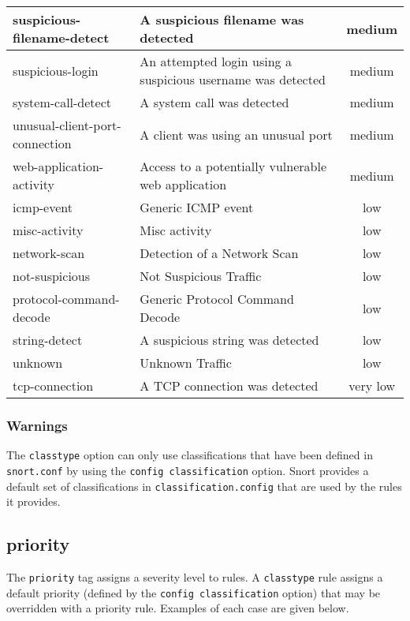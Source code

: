 \documentclass[english]{report}
\begin{document}
\begin{center}
\begin{longtable}[h]{|p{2in}|p{2.5in}|c|}
\hline 
suspicious-filename-detect&
A suspicious filename was detected & medium\\
\hline 
suspicious-login&
An attempted login using a suspicious username was detected & medium\\
\hline 
system-call-detect&
A system call was detected & medium\\
\hline 
unusual-client-port-connection&
A client was using an unusual port & medium\\
\hline 
web-application-activity&
Access to a potentially vulnerable web application & medium\\
\hline
icmp-event&
Generic ICMP event & low\\
\hline 
misc-activity&
Misc activity & low\\
\hline 
network-scan&
Detection of a Network Scan & low\\
\hline 
not-suspicious&
Not Suspicious Traffic & low\\
\hline 
protocol-command-decode&
Generic Protocol Command Decode & low\\
\hline 
string-detect&
A suspicious string was detected & low\\
\hline 
unknown&
Unknown Traffic & low\\
\hline
tcp-connection&
A TCP connection was detected & very low\\
\hline
\end{longtable}
\end{center}

\subsubsection{Warnings}

The \texttt{classtype} option can only use classifications that have been
defined in \texttt{snort.conf} by using the \texttt{config classification}
option.  Snort provides a default set of classifications in
\texttt{classification.config} that are used by the rules it provides.

\subsection{priority}

The \texttt{priority} tag assigns a severity level to rules. A
\texttt{classtype} rule assigns a default priority (defined by the
\texttt{config classification} option) that may be overridden with a priority
rule.  Examples of each case are given below.
\end{document}
